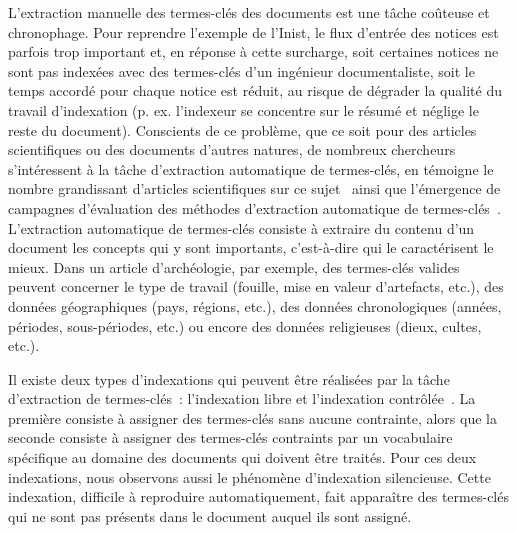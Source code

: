       L'extraction manuelle des termes-clés des documents est une tâche coûteuse
      et chronophage. Pour reprendre l'exemple de l'Inist, le flux d'entrée des
      notices est parfois trop important et, en réponse à cette surcharge, soit
      certaines notices ne sont pas indexées avec des termes-clés d'un ingénieur
      documentaliste, soit le temps accordé pour chaque notice est réduit, au
      risque de dégrader la qualité du travail d'indexation (p. ex. l'indexeur
      se concentre sur le résumé et néglige le reste du document). Conscients de
      ce problème, que ce soit pour des articles scientifiques ou des documents
      d'autres natures, de nombreux chercheurs s'intéressent à la tâche
      d'extraction automatique de termes-clés, en témoigne le nombre grandissant
      d'articles scientifiques sur ce sujet~\citep{hasan2014state_of_the_art}
      ainsi que l'émergence de campagnes d'évaluation des méthodes d'extraction
      automatique de termes-clés~\citep{kim2010semeval,paroubek2012deft}.
      L'extraction automatique de termes-clés consiste à extraire du contenu
      d'un document les concepts qui y sont importants, c'est-à-dire qui le
      caractérisent le mieux. Dans un article d'archéologie, par exemple, des
      termes-clés valides peuvent concerner le type de travail (fouille, mise en
      valeur d'artefacts, etc.), des données géographiques (pays, régions,
      etc.), des données chronologiques (années, périodes, sous-périodes, etc.)
      ou encore des données religieuses (dieux, cultes, etc.).

      Il existe deux types d'indexations qui peuvent être réalisées par la tâche
      d'extraction de termes-clés~: l'indexation libre et l'indexation
      contrôlée~\citep{paroubek2012deft}. La première consiste à assigner des
      termes-clés sans aucune contrainte, alors que la seconde consiste à
      assigner des termes-clés contraints par un vocabulaire spécifique au
      domaine des documents qui doivent être traités. Pour ces deux indexations,
      nous observons aussi le phénomène d'indexation silencieuse. Cette
      indexation, difficile à reproduire automatiquement, fait apparaître des
      termes-clés qui ne sont pas présents dans le document auquel ils sont
      assigné.

